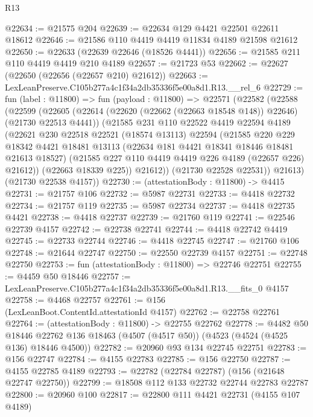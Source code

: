 \begin{lexlean}{R13}
\begin{coremodule}
@22634 := @21575 @204
@22639 := @22634 @129 @4421 @22501 @22611 @18612
@22646 := @21586 @110 @4419 @4419 @11834 @4189 @21598 @21612
@22650 := @22633 (@22639 @22646 (@18526 @4441))
@22656 := @21585 @211 @110 @4419 @4419 @210 @4189
@22657 := @21723 @53
@22662 := @22627 (@22650 (@22656 (@22657 @210) @21612))
@22663 := LexLeanPreserve.C105b277a4c1f34a2db35336f5e00a8d1.R13.__rel_6
@22729 := fun (label : @11800) =>
  fun (payload : @11800) =>
  @22571
    (@22582
      (@22588
        (@22599
          (@22605
            (@22614 (@22620 (@22662 (@22663 @18548 @148)) @22646) (@21730 @22513 @4441))
            (@21585
              @231
              @110
              @22522
              @4419
              @22594
              @4189
              (@22621
                @230
                @22518
                @22521
                (@18574 @13113)
                @22594
                (@21585
                  @220
                  @229
                  @18342
                  @4421
                  @18481
                  @13113
                  (@22634 @181 @4421 @18341 @18446 @18481 @21613 @18527)
                  (@21585 @227 @110 @4419 @4419 @226 @4189 (@22657 @226) @21612))
                (@22663 @18339 @225))
              @21612))
          (@21730 @22528 @22531))
        @21613)
      (@21730 @22538 @4157))
@22730 := (attestationBody : @11800) -> @4415
@22731 := @21757 @106
@22732 := @5987 @22731
@22733 := @4418 @22732
@22734 := @21757 @119
@22735 := @5987 @22734
@22737 := @4418 @22735 @4421
@22738 := @4418 @22737
@22739 := @21760 @119
@22741 := @22546 @22739 @4157
@22742 := @22738 @22741
@22744 := @4418 @22742 @4419
@22745 := @22733 @22744
@22746 := @4418 @22745
@22747 := @21760 @106
@22748 := @21644 @22747
@22750 := @22550 @22739 @4157
@22751 := @22748 @22750
@22753 := fun (attestationBody : @11800) => @22746 @22751
@22755 := @4459 @50 @18446
@22757 := LexLeanPreserve.C105b277a4c1f34a2db35336f5e00a8d1.R13.__fits_0 @4157
@22758 := @4468 @22757
@22761 := @156 (LexLeanBoot.ContentId.attestationId @4157)
@22762 := @22758 @22761
@22764 := (attestationBody : @11800) -> @22755 @22762
@22778 := @4482
    @50
    @18446
    @22762
    @136
    @18463
    (@4507 (@4517 @50))
    (@4523 (@4524 (@4525 @136) @18446 @4500))
@22782 := @20960 @93 @134 @22745 @22751
@22783 := @156 @22747
@22784 := @4155 @22783
@22785 := @156 @22750
@22787 := @4155 @22785 @4189
@22793 := @22782 (@22784 @22787) (@156 (@21648 @22747 @22750))
@22799 := @18508 @112 @133 @22732 @22744 @22783 @22787
@22800 := @20960 @100
@22817 := @22800
    @111
    @4421
    @22731
    (@4155 @107 @4189)

\end{coremodule}
\end{lexlean}
